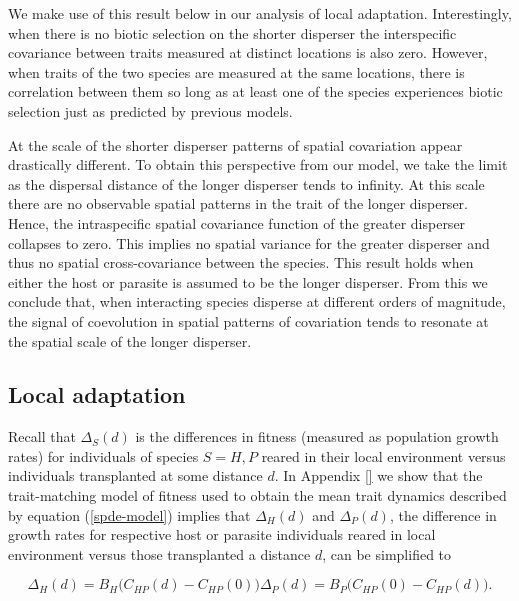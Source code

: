 \documentclass{article}
\begin{document}
We make use of this result below in our analysis of local adaptation.
Interestingly, when there is no biotic selection on the shorter
disperser the interspecific covariance between traits measured at
distinct locations is also zero. However, when traits of the two species
are measured at the same locations, there is correlation between them so
long as at least one of the species experiences biotic selection just as
predicted by previous models.

At the scale of the shorter disperser patterns of spatial covariation
appear drastically different. To obtain this perspective from our model,
we take the limit as the dispersal distance of the longer disperser
tends to infinity. At this scale there are no observable spatial
patterns in the trait of the longer disperser. Hence, the intraspecific
spatial covariance function of the greater disperser collapses to zero.
This implies no spatial variance for the greater disperser and thus no
spatial cross-covariance between the species. This result holds when
either the host or parasite is assumed to be the longer disperser. From
this we conclude that, when interacting species disperse at different
orders of magnitude, the signal of coevolution in spatial patterns of
covariation tends to resonate at the spatial scale of the longer
disperser.

\hypertarget{local-adaptation}{%
\subsection{Local adaptation}\label{local-adaptation}}

Recall that \(\Delta_S(d)\) is the differences in fitness (measured as
population growth rates) for individuals of species \(S=H,P\) reared in
their local environment versus individuals transplanted at some distance
\(d\). In Appendix \ref{} we show that the trait-matching model of
fitness used to obtain the mean trait dynamics described by equation
(\ref{spde-model}) implies that \(\Delta_H(d)\) and \(\Delta_P(d)\), the
difference in growth rates for respective host or parasite individuals
reared in local environment versus those transplanted a distance \(d\),
can be simplified to

\begin{subequations}
  \begin{equation}
    \Delta_H(d)=B_H\big(C_{HP}(d)-C_{HP}(0)\big)
  \end{equation}
  \begin{equation}
    \Delta_P(d)=B_P\big(C_{HP}(0)-C_{HP}(d)\big).
  \end{equation}
\end{subequations}
\end{document}
